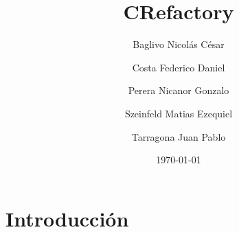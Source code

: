 \documentclass[a4paper,oneside,10pt]{article}
\begin{document}

\title{CRefactory}
\author{Baglivo Nicolás César \and Costa Federico Daniel \and Perera Nicanor Gonzalo \and Szeinfeld Matias Ezequiel \and Tarragona Juan Pablo}
\date{\today}
\maketitle

\tableofcontents

\section{Introducción}
\end{document}
